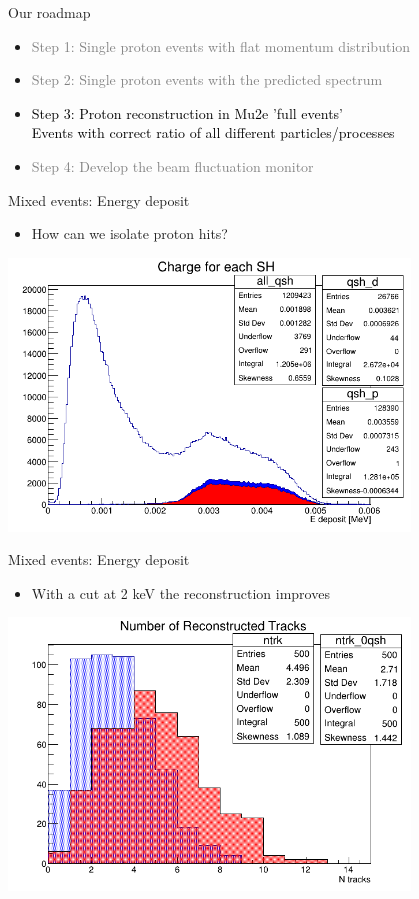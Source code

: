 \documentclass[10pt]{beamer}
\begin{document}
\begin{frame}{Our roadmap}
\begin{itemize}
\setlength\itemsep{0.4cm}
\item \textcolor{gray}{Step 1: Single proton events with flat momentum distribution}
\item \textcolor{gray}{Step 2: Single proton events with the predicted spectrum}
\item \textcolor{black}{Step 3: Proton reconstruction in Mu2e 'full events'\\
Events with correct ratio of all different particles/processes}
\item \textcolor{gray}{Step 4: Develop the beam fluctuation monitor}
\end{itemize}
\end{frame}

%
\begin{frame}{Mixed events: Energy deposit}
\begin{itemize}
\item How can we isolate proton hits?
\end{itemize}
\begin{center}
\includegraphics[width=0.8\textwidth]{plots/mix/mix500_qsh_Ps}
\end{center}
\end{frame}

%
\begin{frame}{Mixed events: Energy deposit}
\begin{itemize}
\item With a cut at 2 keV the reconstruction improves
\end{itemize}
\begin{center}
\includegraphics[width=0.8\textwidth]{plots/mix/mix500_trk_Ps}
\end{center}
\end{frame}
\end{document}

